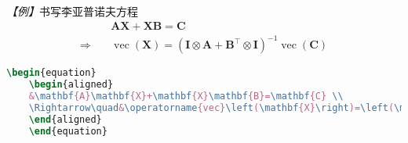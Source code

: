 \emph{【例】}书写李亚普诺夫方程
$$\begin{equation}
        \begin{aligned}
                             & \mathbf{A}\mathbf{X}+\mathbf{X}\mathbf{B}=\mathbf{C}                                                                                                                \\
            \Rightarrow\quad & \operatorname{vec}\left(\mathbf{X}\right)=\left(\mathbf{I}\otimes\mathbf{A}+\mathbf{B}^{\top}\otimes\mathbf{I}\right)^{-1}\operatorname{vec}\left(\mathbf{C}\right)
        \end{aligned}
    \end{equation}$$
\begin{lstlisting}[language=TeX]
    \begin{equation}
    \begin{aligned}
    &\mathbf{A}\mathbf{X}+\mathbf{X}\mathbf{B}=\mathbf{C} \\
    \Rightarrow\quad&\operatorname{vec}\left(\mathbf{X}\right)=\left(\mathbf{I}\otimes\mathbf{A}+\mathbf{B}^{\top}\otimes\mathbf{I}\right)^{-1}\operatorname{vec}\left(\mathbf{C}\right)
    \end{aligned}
    \end{equation}
\end{lstlisting}
